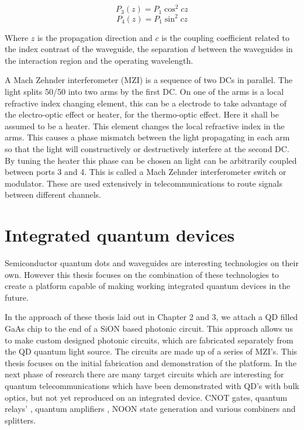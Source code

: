 \begin{equation} P_3(z) = P_1 \cos^2 cz \end{equation} \begin{equation} P_4(z) =
P_1 \sin^2 cz \end{equation}

Where $z$ is the propagation direction and $c$ is the coupling coefficient
related to the index contrast of the waveguide, the separation $d$ between the
waveguides in the interaction region and the operating wavelength.

A Mach Zehnder interferometer (MZI) is a sequence of two DCs in parallel. The
light splits 50/50 into two arms by the first DC. On one of the arms is a local
refractive index changing element, this can be a electrode to take advantage of
the electro-optic effect or heater, for the thermo-optic effect. Here it shall
be assumed to be a heater. This element changes the local refractive index in
the arms. This causes a phase mismatch between the light propagating in each arm
so that the light will constructively or destructively interfere at the second
DC. By tuning the heater this phase can be chosen an light can be arbitrarily
coupled between ports 3 and 4. This is called a Mach Zehnder interferometer
switch or modulator. These are used extensively in telecommunications to route
signals between different channels.

 \section{Integrated quantum devices}

Semiconductor quantum dots and waveguides are interesting technologies on their
own. However this thesis focuses on the combination of these technologies to
create a platform capable of making working integrated quantum devices in the
future.

In the approach of these thesis laid out in Chapter 2 and 3, we attach a QD
filled GaAs chip to the end of a SiON based photonic circuit. This approach
allows us to make custom designed photonic circuits, which are fabricated
separately from the QD quantum light source. The circuits are made up of a
series of MZI's. This thesis focuses on the initial fabrication and
demonstration of the platform. In the next phase of research there are many
target circuits which are interesting for quantum telecommunications which have
been demonstrated with QD's with bulk optics, but not yet reproduced on an
integrated device. CNOT gates\cite{pooley2012controlled}, quantum relays'
\cite{varnava2015entangled}, quantum amplifiers \cite{kocsis2013heralded,
zavatta2011high}, NOON state generation \cite{bennett2015cavity, afek2010high, giovannetti2011advances} and various
combiners and splitters.

